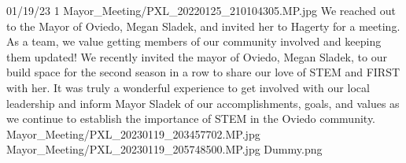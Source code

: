 {01/19/23}
{1}
{Mayor_Meeting/PXL_20220125_210104305.MP.jpg}
{We reached out to the Mayor of Oviedo, Megan Sladek, and invited her to Hagerty for a meeting.}
{As a team, we value getting members of our community involved and keeping them updated! We recently invited the mayor of Oviedo, Megan Sladek, to our build space for the second season in a row to share our love of STEM and FIRST with her. It was truly a wonderful experience to get involved with our local leadership and inform Mayor Sladek of our accomplishments, goals, and values as we continue to establish the importance of STEM in the Oviedo community. 
} 
{Mayor_Meeting/PXL_20230119_203457702.MP.jpg}
{Mayor_Meeting/PXL_20230119_205748500.MP.jpg}
{Dummy.png}
